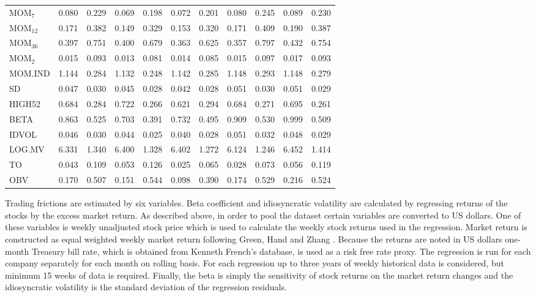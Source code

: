 \documentclass{article}
\begin{document}
\begin{table}[ht]
\begin{tabularx}{\textwidth}{@{\extracolsep{1pt}} X r r r r r r r r r r}
MOM$_{7}$ 	& 0.080 	& 0.229	& 0.069 	& 0.198	& 0.072	& 0.201	& 0.080	& 0.245	& 0.089	& 0.230 \\
MOM$_{12}$ 	& 0.171	& 0.382	& 0.149 	& 0.329	& 0.153	& 0.320	& 0.171	& 0.409	& 0.190	& 0.387 \\
MOM$_{36}$ 	& 0.397	& 0.751	& 0.400 	& 0.679	& 0.363	& 0.625	& 0.357	& 0.797	& 0.432	& 0.754 \\
MOM$_{2}$ 	& 0.015 	& 0.093	& 0.013 	& 0.081	& 0.014	& 0.085	& 0.015	& 0.097	& 0.017	& 0.093 \\ 
MOM.IND 	& 1.144 	& 0.284	& 1.132 	& 0.248	& 1.142	& 0.285	& 1.148	& 0.293	& 1.148	& 0.279 \\
SD	 		& 0.047	& 0.030	& 0.045 	& 0.028	& 0.042	& 0.028	& 0.051	& 0.030	& 0.051	& 0.029 \\
HIGH52		& 0.684 	& 0.284	& 0.722 	& 0.266	& 0.621	& 0.294	& 0.684	& 0.271	& 0.695	& 0.261 \\
BETA	 	& 0.863 	& 0.525	& 0.703 	& 0.391	& 0.732	& 0.495	& 0.909	& 0.530	& 0.999	& 0.509 \\
IDVOL	 	& 0.046 	& 0.030	& 0.044 	& 0.025	& 0.040	& 0.028	& 0.051	& 0.032	& 0.048	& 0.029 \\ 
LOG.MV	 	& 6.331  	& 1.340	& 6.400 	& 1.328	& 6.402	& 1.272	& 6.124	& 1.246	& 6.452	& 1.414 \\ 
TO		 	& 0.043  	& 0.109	& 0.053 	& 0.126	& 0.025	& 0.065	& 0.028	& 0.073	& 0.056	& 0.119 \\
OBV		 	& 0.170 	& 0.507	& 0.151 	& 0.544	& 0.098	& 0.390	& 0.174	& 0.529	& 0.216	& 0.524 \\ 
\bottomrule
\end{tabularx}
\end{table} 


Trading frictions are estimated by six variables. Beta coefficient and idiosyncratic volatility are calculated by regressing returns of the stocks by the excess market return. As described above, in order to pool the dataset certain variables are converted to US dollars. One of these variables is weekly unadjusted stock price which is used to calculate the weekly stock returns used in the regression. Market return is constructed as equal weighted weekly market return following Green, Hand and Zhang \citeyear{Green2017}. Because the returns are noted in US dollars one-month Treasury bill rate, which is obtained from Kenneth French's database, is used as a risk free rate proxy. The regression is run for each company separately for each month on rolling basis. For each regression up to three years of weekly historical data is considered, but minimum 15 weeks of data is required. Finally, the beta is simply the sensitivity of stock returns on the market return changes and the idiosyncratic volatility is the standard deviation of the regression residuals. \par
\end{document}
